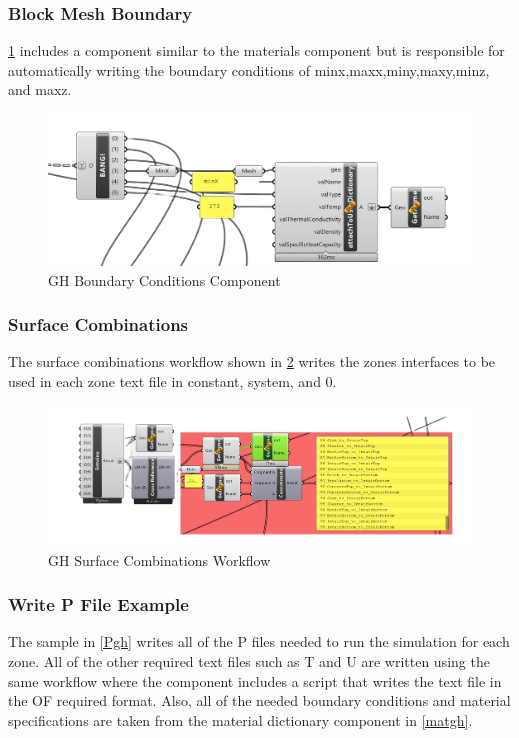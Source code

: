 \subsubsection{Block Mesh Boundary}
\ref{blkmgh} includes a component similar to the materials component but is responsible for automatically writing the boundary conditions of minx,maxx,miny,maxy,minz, and maxz. 

\begin{figure}[tbh]
\centering
\includegraphics[width=0.77\columnwidth]{Figures/bcondgh.png}
\hspace{0.7cm}
\caption{GH Boundary Conditions Component}
\label{blkmgh}
\end{figure}




\subsubsection{Surface Combinations}
The surface combinations workflow shown in \ref{surfgh} writes the zones interfaces to be used in each zone text file in constant, system, and 0. 

\begin{figure}[tbh]
\centering
\includegraphics[width=0.77\columnwidth]{Figures/intergh.png}
\hspace{0.7cm}
\caption{GH Surface Combinations Workflow}
\label{surfgh}
\end{figure}


\subsubsection{Write P File Example}
The sample in \ref{Pgh} writes all of the P files needed to run the simulation for each zone. All of the other required text files such as T and U are written using the same workflow where the component includes a script that writes the text file in the OF required format. Also, all of the needed boundary conditions and material specifications are taken from the material dictionary component in \ref{matgh}.


